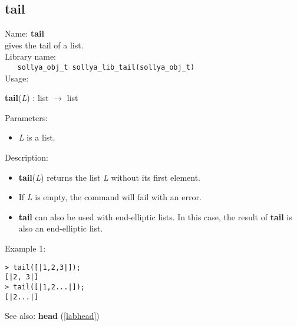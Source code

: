 \subsection{tail}
\label{labtail}
\noindent Name: \textbf{tail}\\
\phantom{aaa}gives the tail of a list.\\[0.2cm]
\noindent Library name:\\
\verb|   sollya_obj_t sollya_lib_tail(sollya_obj_t)|\\[0.2cm]
\noindent Usage: 
\begin{center}
\textbf{tail}(\emph{L}) : \textsf{list} $\rightarrow$ \textsf{list}\\
\end{center}
Parameters: 
\begin{itemize}
\item \emph{L} is a list.
\end{itemize}
\noindent Description: \begin{itemize}

\item \textbf{tail}(\emph{L}) returns the list \emph{L} without its first element.

\item If \emph{L} is empty, the command will fail with an error.

\item \textbf{tail} can also be used with end-elliptic lists. In this case, the result of
   \textbf{tail} is also an end-elliptic list.
\end{itemize}
\noindent Example 1: 
\begin{center}\begin{minipage}{15cm}\begin{Verbatim}[frame=single]
> tail([|1,2,3|]);
[|2, 3|]
> tail([|1,2...|]);
[|2...|]
\end{Verbatim}
\end{minipage}\end{center}
See also: \textbf{head} (\ref{labhead})
